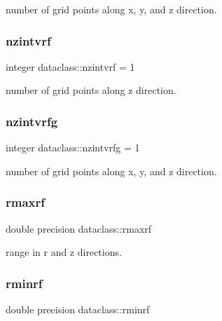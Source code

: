 number of grid points along x, y, and z direction. 

\mbox{\label{namespacedataclass_a7dee8b652907c73253c32891a2a08514}} 
\subsubsection{\texorpdfstring{nzintvrf}{nzintvrf}}
{\footnotesize\ttfamily integer dataclass\+::nzintvrf = 1}



number of grid points along z direction. 

\mbox{\label{namespacedataclass_a53f757bd562f34f7e8e6bb58606fc289}} 
\subsubsection{\texorpdfstring{nzintvrfg}{nzintvrfg}}
{\footnotesize\ttfamily integer dataclass\+::nzintvrfg = 1}



number of grid points along x, y, and z direction. 

\mbox{\label{namespacedataclass_a8ea08da279b20aa500095cba377a2de2}} 
\subsubsection{\texorpdfstring{rmaxrf}{rmaxrf}}
{\footnotesize\ttfamily double precision dataclass\+::rmaxrf}



range in r and z directions. 

\mbox{\label{namespacedataclass_aae1944e971e5c71db5d8f21afceb0935}} 
\subsubsection{\texorpdfstring{rminrf}{rminrf}}
{\footnotesize\ttfamily double precision dataclass\+::rminrf}



